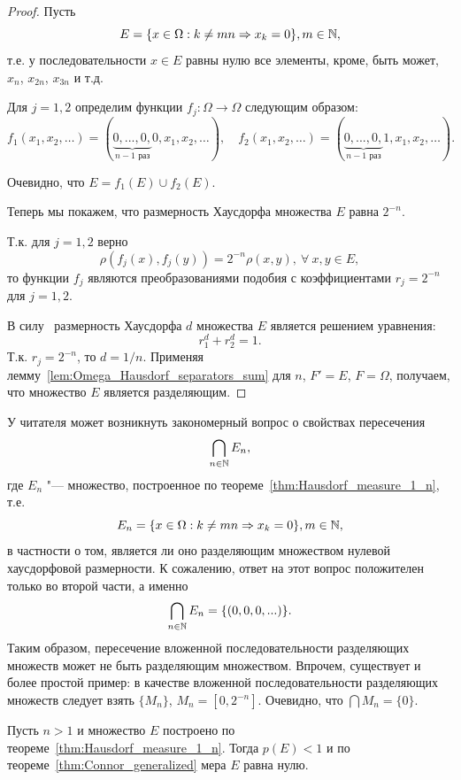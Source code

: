 \begin{proof}
	Пусть
	\begin{equation}
		E= \{ x \in \Omega : k \neq mn \Rightarrow x_k = 0\}, m\in \mathbb{N}
		,
	\end{equation}
	т.е. у последовательности $x \in E$ равны нулю все элементы, кроме, быть может, $x_n$, $x_{2n}$, $x_{3n}$ и т.д.

	Для $j=1,2$ определим функции $f_j : \Omega \to \Omega$ следующим образом:
	\begin{equation}
		f_1(x_1, x_2, \dots)=(\underbrace{0, ..., 0,}_{\mbox{$n-1$ раз}} 0, x_1, x_2, \dots)
		,
		\quad
		f_2(x_1, x_2, \dots)=(\underbrace{0, ..., 0,}_{\mbox{$n-1$ раз}} 1, x_1, x_2, \dots)
		.
	\end{equation}

	Очевидно, что $E=f_1(E)\cup f_2(E).$

	Теперь мы покажем, что размерность Хаусдорфа множества $E$ равна $2^{-n}$.

	Т.к. для $j=1,2$ верно
	 $$\rho(f_j(x),f_j(y))=2^{-n}\rho(x,y), \ \forall \ x, y \in E,$$
	 то функции $f_j$ являются преобразованиями подобия с коэффициентами $r_j=2^{-n}$ для $j=1,2$.


	В силу~\cite[Теорема 9.3]{falconer2003fractal} размерность Хаусдорфа $d$ множества $E$ является решением уравнения:
	$$ r_1^d+r_2^d=1.$$
	Т.к. $r_j=2^{-n}$, то
	$d=1/n.$
	Применяя лемму~\ref{lem:Omega_Hausdorf_separators_sum}
	для $n$, $F'=E$, $F=\Omega$, получаем, что множество $E$ является разделяющим.
\end{proof}

\begin{remark}
	У читателя может возникнуть закономерный вопрос о свойствах пересечения
	\begin{equation}
		\bigcap_{n\in \mathbb{N}} E_{n}
		,
	\end{equation}
	где $E_n$ "--- множество, построенное по теореме~\ref{thm:Hausdorf_measure_1_n}, т.е.
	\begin{equation}
		E_n = \{ x \in \Omega : k \neq mn \Rightarrow x_k = 0\}, m\in \mathbb{N}
		,
	\end{equation}
	в частности о том, является ли оно разделяющим множеством нулевой хаусдорфовой размерности.
	К сожалению, ответ на этот вопрос положителен только во второй части, а именно
	\begin{equation}
		\bigcap_{n\in \mathbb{N}} E_n = \{(0,0,0,...)\}
		.
	\end{equation}
	Таким образом, пересечение вложенной последовательности разделяющих множеств может не быть разделяющим множеством.
	Впрочем, существует и более простой пример:
	в качестве вложенной последовательности разделяющих множеств следует взять $\{M_n\}$, $M_n = [0, 2^{-n}]$.
	Очевидно, что $\bigcap\limits M_n = \{0\}$.
\end{remark}


\begin{remark}
	Пусть $n>1$ и множество $E$ построено по теореме~\ref{thm:Hausdorf_measure_1_n}.
	Тогда $p(E)< 1$ и по теореме~\ref{thm:Connor_generalized} мера $E$ равна нулю.
\end{remark}
